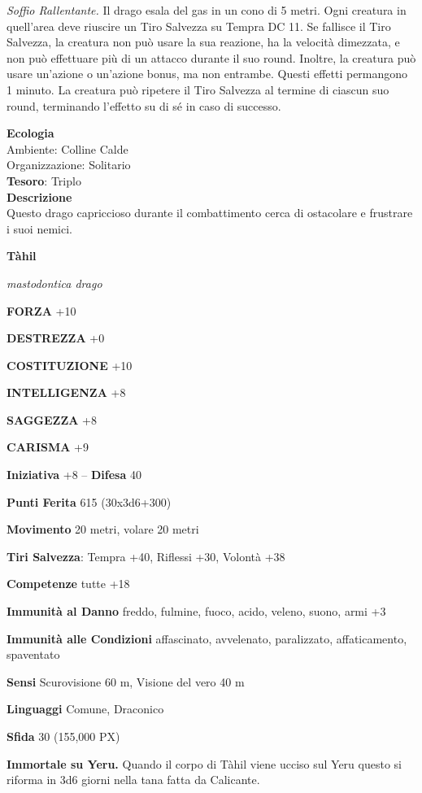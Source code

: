 \begin{multicols}{2}
	\textit{Soffio Rallentante.} Il drago esala del gas in un cono di 5 metri. Ogni creatura in quell'area deve riuscire un Tiro Salvezza su Tempra DC 11. Se fallisce il Tiro Salvezza, la creatura non può usare la sua reazione, ha la velocità dimezzata, e non può effettuare più di un attacco durante il suo round. Inoltre, la creatura può usare un'azione o un'azione bonus, ma non entrambe. Questi effetti permangono 1 minuto. La creatura può ripetere il Tiro Salvezza al termine di ciascun suo round, terminando l'effetto su di sé in caso di successo.

	\textbf{Ecologia}\\
	Ambiente: Colline Calde\\
	Organizzazione: Solitario\\
	\textbf{Tesoro}: Triplo\\
	\textbf{Descrizione}\\
	Questo drago capriccioso durante il combattimento cerca di ostacolare e frustrare i suoi nemici.

	\medskip{}\textbf{Tàhil}

	\textit{mastodontica drago}

	\textbf{FORZA} +10

	\textbf{DESTREZZA} +0

	\textbf{COSTITUZIONE} +10

	\textbf{INTELLIGENZA} +8

	\textbf{SAGGEZZA} +8

	\textbf{CARISMA} +9

	\textbf{Iniziativa} +8 -- \textbf{Difesa} 40

	\textbf{Punti Ferita} 615 (30x3d6+300)

	\textbf{Movimento} 20 metri, volare 20 metri

	\textbf{Tiri Salvezza}: Tempra +40, Riflessi +30, Volontà +38

	\textbf{Competenze} tutte +18

	\textbf{Immunità al Danno} freddo, fulmine, fuoco, acido, veleno, suono, armi +3

	\textbf{Immunità alle Condizioni} affascinato, avvelenato, paralizzato, affaticamento, spaventato

	\textbf{Sensi} Scurovisione 60 m, Visione del vero 40 m

	\textbf{Linguaggi} Comune, Draconico

	\textbf{Sfida} 30 (155,000 PX)

	\textbf{Immortale su Yeru.} Quando il corpo di Tàhil viene ucciso sul Yeru questo si riforma in 3d6 giorni nella tana fatta da Calicante.


\end{multicols}
